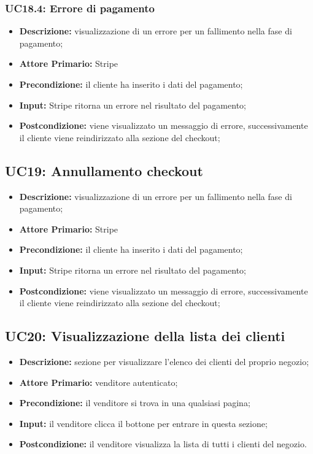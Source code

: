             \subsubsection{UC18.4: Errore di pagamento}
            \label{sec:UC18.4}
                \begin{itemize}
                    \item \textbf{Descrizione:} visualizzazione di un errore per un fallimento nella fase di pagamento;
                    \item \textbf{Attore Primario:} Stripe
                    \item \textbf{Precondizione:} il cliente ha inserito i dati del pagamento;
                    \item \textbf{Input:} Stripe ritorna un errore nel risultato del pagamento;
                    \item \textbf{Postcondizione:} viene visualizzato un messaggio di errore, successivamente il cliente viene reindirizzato alla sezione del checkout;
                \end{itemize}

        
\subsection{UC19: Annullamento checkout}
\label{sec:UC19}
\begin{itemize}
    \item \textbf{Descrizione:} visualizzazione di un errore per un fallimento nella fase di pagamento;
    \item \textbf{Attore Primario:} Stripe
    \item \textbf{Precondizione:} il cliente ha inserito i dati del pagamento;
    \item \textbf{Input:} Stripe ritorna un errore nel risultato del pagamento;
    \item \textbf{Postcondizione:} viene visualizzato un messaggio di errore, successivamente il cliente viene reindirizzato alla sezione del checkout;
\end{itemize}

        \subsection{UC20: Visualizzazione della lista dei clienti}
        \label{sec:UC20}
            \begin{itemize}
                \item \textbf{Descrizione:} sezione per visualizzare l'elenco dei clienti del proprio negozio;
                \item \textbf{Attore Primario:} venditore autenticato; 
                \item \textbf{Precondizione:} il venditore si trova in una qualsiasi pagina;
                \item \textbf{Input:} il venditore clicca il bottone per entrare in questa sezione; 
                \item \textbf{Postcondizione:} il venditore visualizza la lista di tutti i clienti del negozio.
                \end{itemize}


